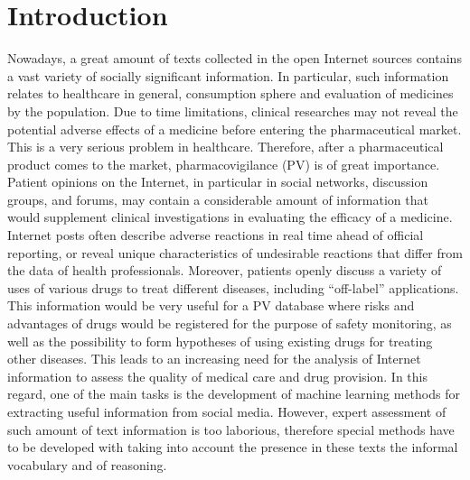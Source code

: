 \documentclass[a4paper,fleqn,longmktitle]{cas-dc}
\begin{document}
\section{Introduction}
Nowadays, a great amount of texts collected in the open Internet sources contains a vast variety of socially significant information. In particular, such information relates to healthcare in general, consumption sphere and evaluation of medicines by the population. Due to time limitations, clinical researches may not reveal the potential adverse effects of a medicine before entering the pharmaceutical market. This is a very serious problem in healthcare. Therefore, after a pharmaceutical product comes to the market, pharmacovigilance (PV) is of great importance. Patient opinions on the Internet, in particular in social networks, discussion groups, and forums, may contain a considerable amount of information that would supplement clinical investigations in evaluating the efficacy of a medicine. Internet posts often describe adverse reactions in real time ahead of official reporting, or reveal unique characteristics of undesirable reactions that differ from the data of health professionals. Moreover, patients openly discuss a variety of uses of various drugs to treat different diseases, including ``off-label'' applications. This information would be very useful for a PV database where risks and advantages of drugs would be registered for the purpose of safety monitoring, as well as the possibility to form hypotheses of using existing drugs for treating other diseases. This leads to an increasing need for the analysis of Internet information %
to assess the quality of medical care and drug provision. In this regard, one of the main tasks is the development of machine learning methods for extracting useful information from social media. %
However, expert assessment of such amount of  text information is too laborious, therefore special methods 
 have to be developed with taking into account the presence in  these texts the informal vocabulary and  of reasoning.  
\end{document}

